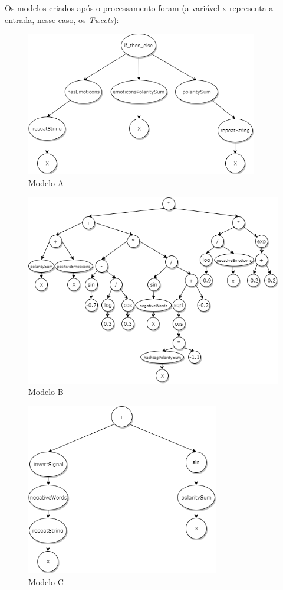 \documentclass[12pt]{article}
\begin{document}
Os modelos criados após o processamento foram (a variável x representa a entrada, nesse caso, os \emph{Tweets}):

	\begin{figure}[H]
		\centering
		\includegraphics[width=0.9\textwidth]{treeA}
		\caption{Modelo A}
		\label{AModel}
	\end{figure}
	
	\begin{figure}[H]
		\centering
		\includegraphics[width=1.0\textwidth]{treeB2}
		\caption{Modelo B}
		\label{BModel}
	\end{figure}

	\begin{figure}[H]
		\centering
		\includegraphics[width=0.75\textwidth]{treeC}
		\caption{Modelo C}
		\label{CModel}
	\end{figure}
\end{document}
